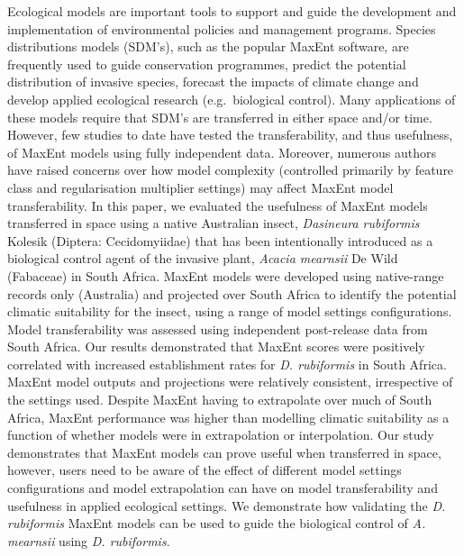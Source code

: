 \documentclass[12pt,]{article}
\begin{document}
Ecological models are important tools to support and guide the
development and implementation of environmental policies and management
programs. Species distributions models (SDM's), such as the popular
MaxEnt software, are frequently used to guide conservation programmes,
predict the potential distribution of invasive species, forecast the
impacts of climate change and develop applied ecological research
(e.g.~biological control). Many applications of these models require
that SDM's are transferred in either space and/or time. However, few
studies to date have tested the transferability, and thus usefulness, of
MaxEnt models using fully independent data. Moreover, numerous authors
have raised concerns over how model complexity (controlled primarily by
feature class and regularisation multiplier settings) may affect MaxEnt
model transferability. In this paper, we evaluated the usefulness of
MaxEnt models transferred in space using a native Australian insect,
\emph{Dasineura rubiformis} Kolesik (Diptera: Cecidomyiidae) that has
been intentionally introduced as a biological control agent of the
invasive plant, \emph{Acacia mearnsii} De Wild (Fabaceae) in South
Africa. MaxEnt models were developed using native-range records only
(Australia) and projected over South Africa to identify the potential
climatic suitability for the insect, using a range of model settings
configurations. Model transferability was assessed using independent
post-release data from South Africa. Our results demonstrated that
MaxEnt scores were positively correlated with increased establishment
rates for \emph{D. rubiformis} in South Africa. MaxEnt model outputs and
projections were relatively consistent, irrespective of the settings
used. Despite MaxEnt having to extrapolate over much of South Africa,
MaxEnt performance was higher than modelling climatic suitability as a
function of whether models were in extrapolation or interpolation. Our
study demonstrates that MaxEnt models can prove useful when transferred
in space, however, users need to be aware of the effect of different
model settings configurations and model extrapolation can have on model
transferability and usefulness in applied ecological settings. We
demonstrate how validating the \emph{D. rubiformis} MaxEnt models can be
used to guide the biological control of \emph{A. mearnsii} using
\emph{D. rubiformis}.

~

\setlength{\parindent}{0in}
\setlength{\leftskip}{0in}
\setlength{\parskip}{8pt}
\vspace*{-0.2in}
\end{document}
